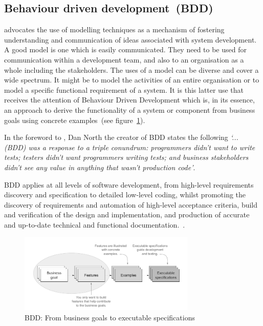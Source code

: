 \documentclass[dissertation,final]{softeng}
\begin{document}
\subsection{Behaviour driven development~(BDD)}
\label{ch:Background:sec:bdd}
\citet{Hull2011} advocates the use of modelling techniques as a mechanism of fostering understanding and communication of ideas associated with system development. A good model is one which is easily communicated. They need to be used for communication within a development team, and also to an organisation as a whole including the stakeholders. The uses of a model can be diverse and cover a wide spectrum. It might be to model the activities of an entire organisation or to model a specific functional requirement of a system. It is this latter use that receives the attention of Behaviour Driven Development which is, in its essence, an approach to derive the functionality of a system or component from business goals using concrete examples~(see figure~\ref{fig:bdd_from_goals_to_specs}).

In the foreword to , Dan North the creator of BDD states the following \emph{`... (BDD) was a response to a triple conundrum: programmers didn't want to write tests; testers didn't want programmers writing tests; and business stakeholders didn't see any value in anything that wasn't production code'}.

BDD applies at all levels of software development, from high-level requirements discovery and specification to detailed low-level coding, whilst promoting the discovery of requirements and automation of high-level acceptance criteria, build and verification of the design and implementation, and production of accurate and up-to-date technical and functional documentation.~\citep{Smart201410}.

\begin{figure}[h]
\includegraphics[width=0.75\textwidth]{BDD}
\centering
\caption[From business goals to executable specifications]{BDD: From business goals to executable specifications~\citep{Smart201410}}
\label{fig:bdd_from_goals_to_specs}
\end{figure}
\end{document}
